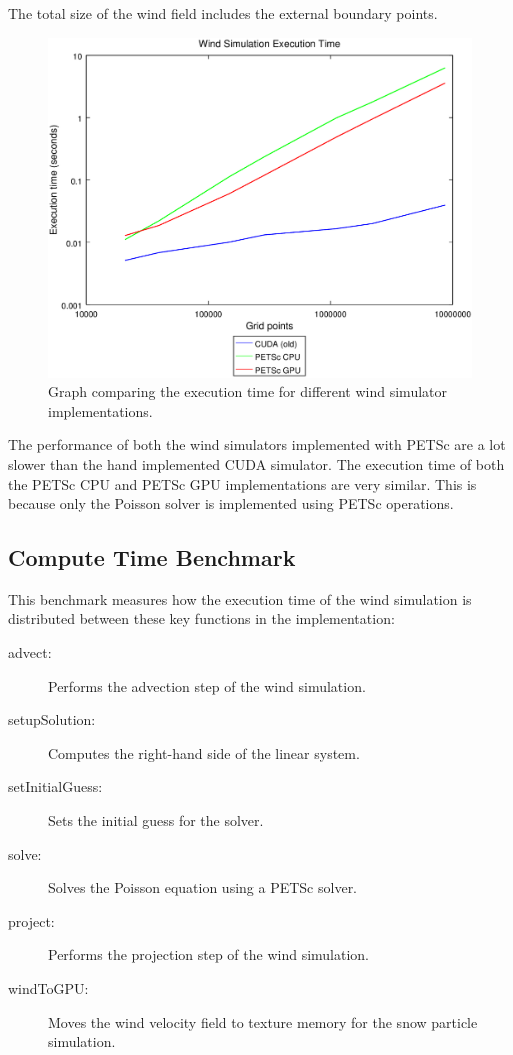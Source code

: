 The total size of the wind field includes the external boundary points.

\begin{figure}[ht]
	\center
	\includegraphics[width=1.0\textwidth]{results/data/wb/exec_time_all}
	\caption{Graph comparing the execution time for different wind simulator
		implementations.}
	\label{fig:wind_sim_time}
\end{figure}

The performance of both the wind simulators implemented with PETSc are a lot slower
than the hand implemented CUDA simulator. The execution time of both the PETSc
CPU and PETSc GPU implementations are very similar. This is because only the
Poisson solver is implemented using PETSc operations.

\subsection{Compute Time Benchmark}

This benchmark measures how the execution time of the wind simulation is distributed
between these key functions in the implementation:
\begin{description}
	\item[advect:] Performs the advection step of the wind simulation.
	\item[setupSolution:] Computes the right-hand side of the linear system.
	\item[setInitialGuess:] Sets the initial guess for the solver.
	\item[solve:] Solves the Poisson equation using a PETSc solver.
	\item[project:] Performs the projection step of the wind simulation.
	\item[windToGPU:] Moves the wind velocity field to texture memory for the
	snow particle simulation.
\end{description}

